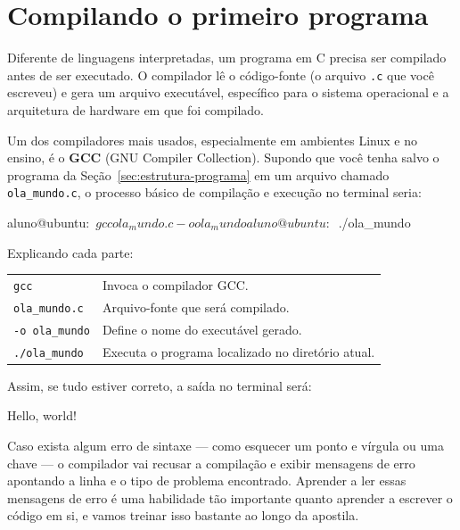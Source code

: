 \documentclass[12pt,a4paper,oneside]{extreport}
\begin{document}
\section{Compilando o primeiro programa}

Diferente de linguagens interpretadas, um programa em C precisa ser compilado antes de ser executado. O compilador lê o código-fonte (o arquivo \texttt{.c} que você escreveu) e gera um arquivo executável, específico para o sistema operacional e a arquitetura de hardware em que foi compilado.

Um dos compiladores mais usados, especialmente em ambientes Linux e no ensino, é o \textbf{GCC} (GNU Compiler Collection). Supondo que você tenha salvo o programa da Seção~\ref{sec:estrutura-programa} em um arquivo chamado \texttt{ola\_mundo.c}, o processo básico de compilação e execução no terminal seria:


\begin{terminal}
aluno@ubuntu:~$ gcc ola_mundo.c -o ola_mundo

aluno@ubuntu:~$ ./ola_mundo

\end{terminal}


Explicando cada parte:

\begin{tabular}{p{4.4cm}p{10cm}}
\texttt{gcc} & Invoca o compilador GCC.\\[0.2cm]

\texttt{ola\_mundo.c} &
Arquivo-fonte que será compilado.\\[0.2cm]

\texttt{-o ola\_mundo} &
Define o nome do executável gerado.\\[0.2cm]

\texttt{./ola\_mundo} &
Executa o programa localizado no diretório atual.
\end{tabular}


Assim, se tudo estiver correto, a saída no terminal será:

\begin{terminal}
Hello, world!
\end{terminal}

Caso exista algum erro de sintaxe — como esquecer um ponto e vírgula ou uma chave — o compilador vai recusar a compilação e exibir mensagens de erro apontando a linha e o tipo de problema encontrado. Aprender a ler essas mensagens de erro é uma habilidade tão importante quanto aprender a escrever o código em si, e vamos treinar isso bastante ao longo da apostila.
\end{document}
